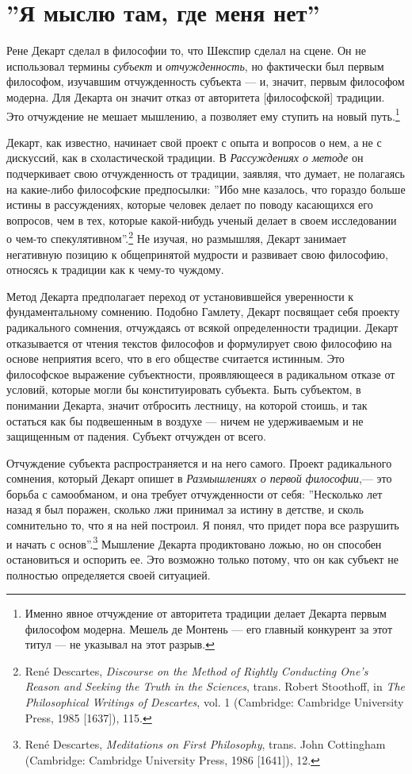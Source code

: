 \documentclass[12pt]{book}
\begin{document}
\section{''Я мыслю там, где меня нет''}

Рене Декарт сделал в философии то, что Шекспир сделал на сцене. Он не использовал термины \textit{субъект} и \textit{отчужденность}, но фактически был первым философом, изучавшим отчужденность субъекта --- и, значит, первым философом модерна. Для Декарта он значит отказ от авторитета [философской] традиции. Это отчуждение не мешает мышлению, а позволяет ему ступить на новый путь.\footnote{Именно явное отчуждение от авторитета традиции делает Декарта первым философом модерна. Мешель де Монтень --- его главный конкурент за этот титул --- не указывал на этот разрыв.}

Декарт, как известно, начинает свой проект с опыта и вопросов о нем, а не с дискуссий, как в схоластической традиции. В \textit{Рассуждениях о методе} он подчеркивает свою отчужденность от традиции, заявляя, что думает, не полагаясь на какие-либо философские предпосылки: ''Ибо мне казалось, что гораздо больше истины в рассуждениях, которые человек делает по поводу касающихся его вопросов, чем в тех, которые какой-нибудь ученый делает в своем исследовании о чем-то спекулятивном''.\footnote{René Descartes, \textit{Discourse on the Method of Rightly Conducting One’s Reason and Seeking the Truth in the Sciences}, trans. Robert Stoothoff, in \textit{The Philosophical Writings of Descartes}, vol. 1 (Cambridge: Cambridge University Press, 1985 [1637]), 115.} Не изучая, но размышляя, Декарт занимает негативную позицию к общепринятой мудрости и развивает свою философию, относясь к традиции как к чему-то чуждому.

Метод Декарта предполагает переход от установившейся уверенности к фундаментальному сомнению. Подобно Гамлету, Декарт посвящает себя проекту радикального сомнения, отчуждаясь от всякой определенности традиции. Декарт отказывается от чтения текстов философов и формулирует свою философию на основе неприятия всего, что в его обществе считается истинным. Это философское выражение субъектности, проявляющееся в радикальном отказе от условий, которые могли бы конституировать субъекта. Быть субъектом, в понимании Декарта, значит отбросить лестницу, на которой стоишь, и так остаться как бы подвешенным в воздухе --- ничем не удерживаемым и не защищенным от падения. Субъект отчужден от всего.

Отчуждение субъекта распространяется и на него самого. Проект радикального сомнения, который Декарт опишет в \textit{Размышлениях о первой философии},--- это борьба с самообманом, и она требует отчужденности от себя: ''Несколько лет назад я был поражен, сколько лжи принимал за истину в детстве, и сколь сомнительно то, что я на ней построил. Я понял, что придет пора все разрушить и начать с основ''.\footnote{René Descartes, \textit{Meditations on First Philosophy}, trans. John Cottingham (Cambridge: Cambridge University Press, 1986 [1641]), 12.} Мышление Декарта продиктовано ложью, но он способен остановиться и оспорить ее. Это возможно только потому, что он как субъект не полностью определяется своей ситуацией.
\end{document}
